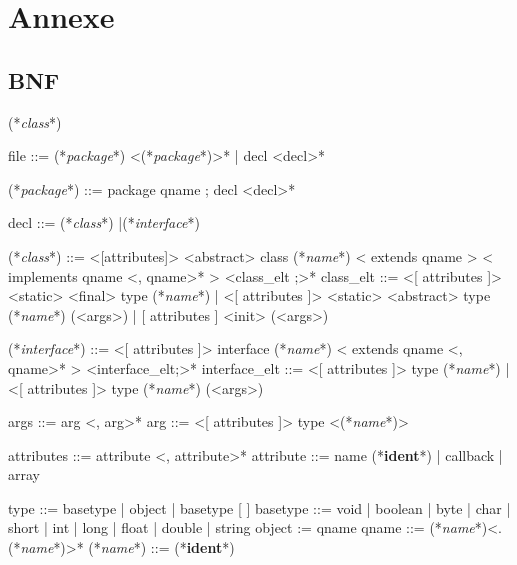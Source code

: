 \documentclass[a4paper, 11pt]{report}
\newcommand{\class}{\ttfamily\textit{class}}
\newcommand{\interface}{\ttfamily\textit{interface}}
\newcommand{\name}{\ttfamily\textit{name}}
\newcommand{\package}{\ttfamily\textit{package}}
\newcommand{\ident}{\footnotesize\textbf{ident}}
\begin{document}


\newpage
\section*{Annexe}


\subsection*{BNF}
\begin{idl}
(*\class*)

file ::= (*\package*) <(*\package*)>*
  	| decl <decl>*
 
(*\package*) ::= package qname ; decl <decl>*

decl ::= (*\class*)
  	|(*\interface*)
 
(*\class*) ::= <[attributes]> <abstract> class (*\name*)
  	  < extends qname >
  	  < implements qname <, qname>* >
  	  { <class_elt ;>* }
class_elt ::= <[ attributes ]> <static> <final> type (*\name*)
            | <[ attributes ]> <static> <abstract> type (*\name*) (<args>)
            | [ attributes ] <init> (<args>)
 
(*\interface*) ::= <[ attributes ]> interface (*\name*)
  	       < extends qname <, qname>* >
  	      { <interface_elt;>* }
interface_elt ::= 
     <[ attributes ]> type (*\name*)
   | <[ attributes ]> type (*\name*) (<args>)
 
args ::= arg <, arg>*
arg ::= <[ attributes ]> type <(*\name*)>
 
attributes ::= 	attribute <, attribute>*
attribute ::= name (*\ident*)
  	    | callback
  	    | array
 
type ::= basetype
       | object
       | basetype [ ]
basetype ::= void
           | boolean
           | byte
           | char
           | short
           | int
           | long
           | float
           | double
           | string
object := qname
qname ::= (*\name*)<.(*\name*)>*
(*\name*) ::= (*\ident*)
\end{idl}
\newpage
\end{document}
